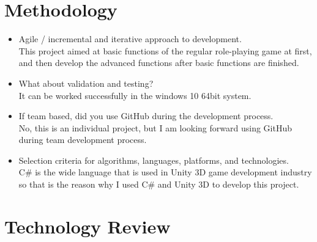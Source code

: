 \chapter{Methodology}

\begin{itemize}
\item Agile / incremental and iterative approach to development. \\
This project aimed at basic functions of the regular role-playing game at first, and then develop the advanced functions after basic functions are finished. 
\item What about validation and testing? \\
It can be worked successfully in the windows 10 64bit system. 
\item If team based, did you use GitHub during the development process.\\
No, this is an individual project, but I am looking forward using GitHub during team development process.
\item Selection criteria for algorithms, languages, platforms, and technologies.\\
C\# is the wide language that is used in Unity 3D game development industry so that is the reason why I used C\# and Unity 3D to develop this project.
\end{itemize}


\chapter{Technology Review}
